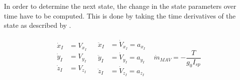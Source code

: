 In order to determine the next state, the change in the state parameters over time have to be computed. This is done by taking the time derivatives of the state as described by .

\begin{align} \label{eq:state_derivativesModel}
\begin{split} 
\dot{x}_{I}&=V_{x_{I}}\\
\dot{y}_{I}&=V_{y_{I}}\\
\dot{z}_{I}&=V_{z_{I}}
\end{split} 
&
\begin{split}
\ddot{x}_{I}&=\dot{V}_{x_{I}}=a_{x_{I}}\\
\ddot{y}_{I}&=\dot{V}_{y_{I}}=a_{y_{I}}\\
\ddot{z}_{I}&=\dot{V}_{z_{I}}=a_{z_{I}}
\end{split}
&
\dot{m}_{MAV}=-\dfrac{T}{g_{0}I_{sp}}
\end{align}

